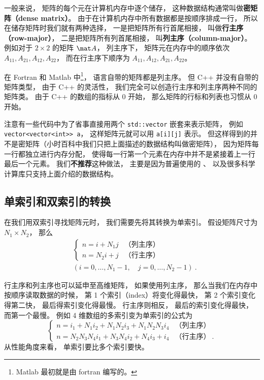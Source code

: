 

一般来说， 矩阵的每个元在计算机内存中逐个储存， 这种数据结构通常叫做\textbf{密矩阵（dense matrix）}。 由于在计算机内存中所有数据都是按顺序排成一行， 所以在储存矩阵时我们就有两种选择， 一是把矩阵所有行首尾相接， 叫做\textbf{行主序（row-major）}， 二是把矩阵所有列首尾相接， 叫\textbf{列主序（column-major）}。 例如对于 $2 \times 2$ 的矩阵 $\mat A$， 列主序下， 矩阵元在内存中的顺序依次 $A_{11}, A_{21}, A_{12}, A_{22}$， 而在行主序下顺序为 $A_{11},A_{12},A_{21},A_{22}$。

在 Fortran 和 Matlab 中\footnote{Matlab 最初就是由 fortran 编写的。}， 语言自带的矩阵都是列主序。 但 C++ 并没有自带的矩阵类型， 由于 C++ 的灵活性， 我们完全可以创造行主序和列主序两种不同的矩阵类。 由于 C++ 的数组的指标从 0 开始， 那么矩阵的行标和列表也习惯从 0 开始。

注意有一些代码中为了省事直接用两个 \verb`std::vector` 嵌套来表示矩阵， 例如 \verb`vector<vector<int>> a`， 这样矩阵元就可以用 \verb`a[i][j]` 表示。 但这样得到的并不是密矩阵（小时百科中我们只把上面描述的数据结构叫做密矩阵）， 因为矩阵每一行都独立进行内存分配， 使得每一行第一个元素在内存中并不是紧接着上一行最后一个元素。 我们\textbf{不推荐}这种做法， 主要是因为普遍使用的 、  以及很多科学计算库只支持上面介绍的数据结构。

\subsection{单索引和双索引的转换}
在我们用双索引寻找矩阵元时， 我们需要先将其转换为单索引。 假设矩阵尺寸为 $N_1 \times N_2$， 那么
\begin{equation}
\begin{aligned}
&\begin{cases}
n = i + N_1 j  &\text{（列主序）}\\
n = N_2 i + j  &\text{（行主序）}
\end{cases}\\
&(i = 0, \dots, N_1-1,\quad j = 0, \dots, N_2-1)~.
\end{aligned}
\end{equation}

行主序和列主序也可以延申至高维矩阵， 如果使用列主序， 那么当我们在内存中按顺序读取数据的时候， 第 1 个索引（index）将变化得最快， 第 2 个索引变化得第二快， 最后得索引变化得最慢。 行主序则相反， 最后的索引变化得最快， 而第一个最慢。 例如 4 维数组的多索引变为单索引的公式为
\begin{equation}
\begin{cases}
n = i_1 + N_1 i_2 + N_1 N_2 i_3 + N_1 N_2 N_3 i_4  &\text{（列主序）}\\
n = N_2 N_3 N_4 i_1 + N_3 N_4 i_2 + N_4 i_3 + i_4  &\text{（行主序）} ~.
\end{cases}
\end{equation}
从性能角度来看， 单索引要比多个索引要快。

